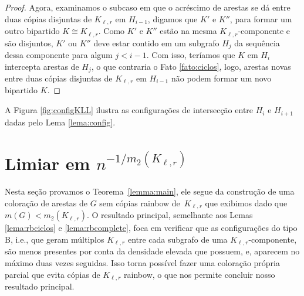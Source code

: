 \documentclass[12pt,a4paper]{book}
\newcommand{\K}{K_{\ell,r}} %
\begin{document}
\begin{proof}
   Agora, examinamos o subcaso em que o acréscimo de arestas se dá entre duas cópias disjuntas de $\K$ em $H_{i-1}$, digamos que $K'$ e $K''$, para formar um outro bipartido $K\cong\K$.
    Como $K'$ e $K''$ estão na mesma $\K$-componente e são disjuntos, $K'$ ou $K''$ deve estar contido em um subgrafo $H_j$ da sequência dessa componente para algum $j<i-1$.
    Com isso, teríamos que $K$ em $H_i$ intercepta arestas de $H_j$, o que contraria o Fato \ref{fato:ciclos}, logo, arestas novas entre duas cópias disjuntas de $\K$ em $H_{i-1}$ não podem formar um novo bipartido $K$.

\end{proof}
  
  A Figura \ref{fig:configKLL} ilustra as configurações de intersecção entre $H_i$ e $H_{i+1}$ dadas pelo Lema \ref{lema:config}.

\section{Limiar em $n^{-1/m_2(K_{\ell,r})}$}
\label{sec:mainres}

Nesta seção provamos o Teorema~\ref{lemma:main}, ele segue da construção de uma coloração de arestas de $G$ sem cópias rainbow de~$\K$ que exibimos dado que $m(G) < m_2(\K)$.
O resultado principal, semelhante aos Lemas \ref{lema:rbciclos} e \ref{lema:rbcomplete}, foca em verificar que as configurações do tipo B, i.e., que geram múltiplos $\K$ entre cada subgrafo de uma $\K$-componente, são menos presentes por conta da densidade elevada que possuem, e, aparecem no máximo duas vezes seguidas. 
  Isso torna possível fazer uma coloração própria parcial  que evita cópias de $\K$ rainbow, o que nos permite concluir nosso resultado principal.
  
\end{document}
